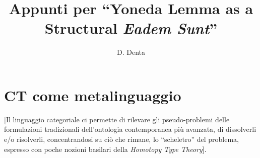 \documentclass[a4paper, 11pt]{article}
\begin{document}
\title{Appunti per ``Yoneda Lemma as a Structural \textit{Eadem Sunt}''}
\author{D. Denta}
\maketitle

\tableofcontents
\section{CT come metalinguaggio}
 [Il linguaggio categoriale ci permette di rilevare gli pseudo-problemi delle formulazioni tradizionali dell'ontologia contemporanea più avanzata, di dissolverli e/o risolverli, concentrandosi su ciò che rimane, lo ``scheletro'' del problema, espresso con poche nozioni basilari della \textit{Homotopy Type Theory}].
\end{document}
